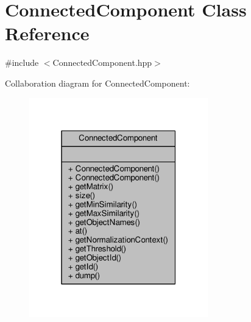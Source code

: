 \hypertarget{classConnectedComponent}{\section{Connected\-Component Class Reference}
\label{classConnectedComponent}
}


{\ttfamily \#include $<$Connected\-Component.\-hpp$>$}



Collaboration diagram for Connected\-Component\-:\nopagebreak
\begin{figure}[H]
\begin{center}
\leavevmode
\includegraphics[width=220pt]{classConnectedComponent__coll__graph}
\end{center}
\end{figure}
